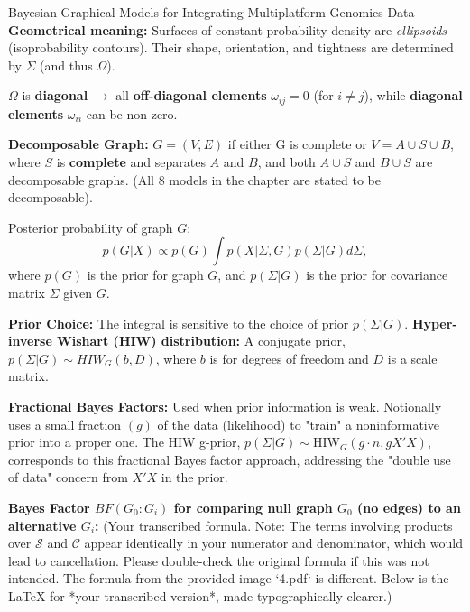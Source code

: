 \documentclass[twocolumn]{article}
\begin{document}
\begin{literaturepaper}{Bayesian Graphical Models for Integrating Multiplatform Genomics Data \cite{Wang_Baladandayuthapani_Holmes_Do_2013}}
    \textbf{Geometrical meaning:} Surfaces of constant probability density are \textit{ellipsoids} (isoprobability contours). Their shape, orientation, and tightness are determined by $\Sigma$ (and thus $\Omega$).

    $\Omega$ is \textbf{diagonal} $\rightarrow$ all \textbf{off-diagonal elements} $\omega_{ij} = 0$ (for $i \neq j$), while \textbf{diagonal elements} $\omega_{ii}$ can be non-zero.

    \textbf{Decomposable Graph:} $G = (V,E)$ if either G is complete or $V = A \cup S \cup B$, where $S$ is \textbf{complete} and separates $A$ and $B$, and both $A \cup S$ and $B \cup S$ are decomposable graphs. (All 8 models in the chapter are stated to be decomposable).

    Posterior probability of graph $G$:
    \[p(G|X) \propto p(G) \int p(X|\Sigma, G) p(\Sigma|G) d\Sigma,\]
    where $p(G)$ is the prior for graph $G$, and $p(\Sigma|G)$ is the prior for covariance matrix $\Sigma$ given $G$.

    \textbf{Prior Choice:} The integral is sensitive to the choice of prior $p(\Sigma|G)$.
    \textbf{Hyper-inverse Wishart (HIW) distribution:} A conjugate prior, $p(\Sigma|G) \sim HIW_G(b, D)$, where $b$ is for degrees of freedom and $D$ is a scale matrix.
    
    \textbf{Fractional Bayes Factors:} Used when prior information is weak. Notionally uses a small fraction $(g)$ of the data (likelihood) to "train" a noninformative prior into a proper one.
    The HIW g-prior, $p(\Sigma|G) \sim \text{HIW}_G(g \cdot n, gX'X)$, corresponds to this fractional Bayes factor approach, addressing the "double use of data" concern from $X'X$ in the prior.

    \textbf{Bayes Factor $BF(G_0 : G_i)$ for comparing null graph $G_0$ (no edges) to an alternative $G_i$:}
    (Your transcribed formula. Note: The terms involving products over $\mathcal{S}$ and $\mathcal{C}$ appear identically in your numerator and denominator, which would lead to cancellation. Please double-check the original formula if this was not intended. The formula from the provided image `4.pdf` is different. Below is the LaTeX for *your transcribed version*, made typographically clearer.)


\end{literaturepaper}
\end{document}
